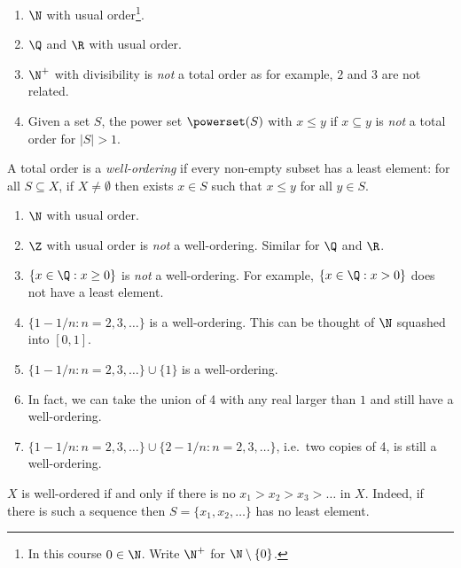 \documentclass[a4paper]{article}
\begin{document}
\begin{eg}\leavevmode
  \begin{enumerate}
  \item \(\N\) with usual order\footnote{In this course \(0 \in \N\). Write \(\N^+\) for \(\N \setminus \{0\}\).}.
  \item \(\Q\) and \(\R\) with usual order.
  \item \(\N^+\) with divisibility is \emph{not} a total order as for example, \(2\) and \(3\) are not related.
  \item Given a set \(S\), the power set \(\powerset(S)\) with \(x \leq y\) if \(x \subseteq y\) is \emph{not} a total order for \(|S| > 1\).
  \end{enumerate}
\end{eg}

\begin{definition}
  A total order is a \emph{well-ordering} if every non-empty subset has a least element: for all \(S \subseteq X\), if \(X \neq \emptyset\) then exists \(x \in S\) such that \(x \leq y\) for all \(y \in S\).
\end{definition}

\begin{eg}\leavevmode
  \begin{enumerate}
  \item \(\N\) with usual order.
  \item \(\Z\) with usual order is \emph{not} a well-ordering. Similar for \(\Q\) and \(\R\).
  \item \(\{x \in \Q: x \geq 0\}\) is \emph{not} a well-ordering. For example, \(\{x \in \Q: x > 0\}\) does not have a least element.
  \item \(\{1 - 1/n: n = 2, 3, \dots\}\) is a well-ordering. This can be thought of \(\N\) squashed into \([0, 1]\).
  \item \(\{1 - 1/n: n = 2, 3, \dots\} \cup \{1\}\) is a well-ordering.
  \item In fact, we can take the union of 4 with any real larger than \(1\) and still have a well-ordering.
  \item \(\{1 - 1/n: n = 2, 3, \dots\} \cup \{2 - 1/n: n = 2, 3, \dots\}\), i.e.\ two copies of 4, is still a well-ordering.
  \end{enumerate}
\end{eg}

\begin{remark}
  \(X\) is well-ordered if and only if there is no \(x_1 > x_2 > x_3 > \dots\) in \(X\). Indeed, if there is such a sequence then \(S = \{x_1, x_2, \dots\}\) has no least element.
\end{remark}
\end{document}
